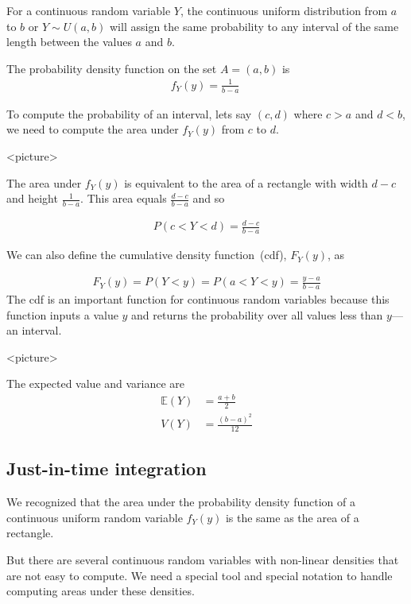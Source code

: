 For a continuous random variable $Y$, the continuous uniform distribution from $a$ to $b$ or $Y \sim U(a,b)$ will assign the same probability to any interval of the same length between the values $a$ and $b$.   

The probability density function on the set $A = (a,b)$ is 
\begin{align}
    f_{Y}(y) = \frac{1}{b-a} \; 
\end{align}


To compute the probability of an interval, lets say $(c,d)$ where $c > a$ and $d < b$, we need to compute the area under $f_{Y}(y)$ from $c$ to $d$.  

<picture>

The area under $f_{Y}(y)$ is equivalent to the area of a rectangle with width $d-c$ and height $\frac{1}{b-a}$. 
This area equals $\frac{d-c}{b-a}$ and so 

\begin{align}
    P( c < Y < d ) = \frac{d-c}{b-a}
\end{align}

We can also define the cumulative density function~(cdf), $F_{Y}(y)$, as 

\begin{align}
    F_{Y}(y) = P(Y < y) = P(a < Y < y ) = \frac{y-a}{b-a}
\end{align}
The cdf is an important function for continuous random variables because this function inputs a value $y$ and returns the probability over all values less than $y$---an interval.

<picture>

The expected value and variance are 
\begin{align}
    \mathbb{E}(Y) &= \frac{a+b}{2}\\
             V(Y) &= \frac{(b-a)^{2}}{12}
\end{align}

\subsection{Just-in-time integration}

We recognized that the area under the probability density function of a continuous uniform random variable $f_{Y}(y)$ is the same as the area of a rectangle. 

But there are several continuous random variables with non-linear densities that are not easy to compute. We need a special tool and special notation to handle computing areas under these densities.

